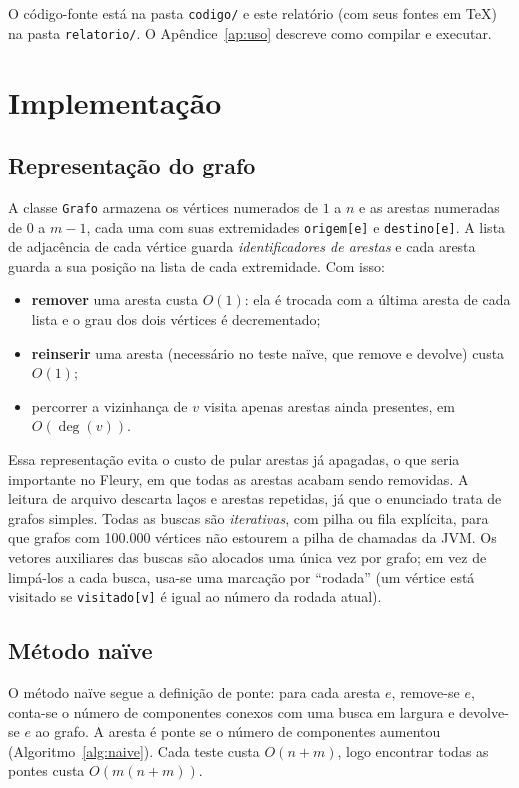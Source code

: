 \documentclass[a4paper,11pt]{article}
\begin{document}
O código-fonte está na pasta \texttt{codigo/} e este relatório (com seus fontes em \TeX) na pasta
\texttt{relatorio/}. O Apêndice~\ref{ap:uso} descreve como compilar e executar.

\section{Implementação}

\subsection{Representação do grafo}

A classe \texttt{Grafo} armazena os vértices numerados de $1$ a $n$ e as arestas numeradas de $0$
a $m-1$, cada uma com suas extremidades \texttt{origem[e]} e \texttt{destino[e]}. A lista de
adjacência de cada vértice guarda \emph{identificadores de arestas} e cada aresta guarda a sua posição
na lista de cada extremidade. Com isso:

\begin{itemize}
  \item \textbf{remover} uma aresta custa $O(1)$: ela é trocada com a última aresta de cada lista e o
        grau dos dois vértices é decrementado;
  \item \textbf{reinserir} uma aresta (necessário no teste naïve, que remove e devolve) custa $O(1)$;
  \item percorrer a vizinhança de $v$ visita apenas arestas ainda presentes, em $O(\deg(v))$.
\end{itemize}

Essa representação evita o custo de pular arestas já apagadas, o que seria importante no Fleury,
em que todas as arestas acabam sendo removidas. A leitura de arquivo descarta laços e arestas
repetidas, já que o enunciado trata de grafos simples. Todas as buscas são \emph{iterativas}, com pilha
ou fila explícita, para que grafos com 100.000 vértices não estourem a pilha de chamadas da JVM.
Os vetores auxiliares das buscas são alocados uma única vez por grafo; em vez de limpá-los a cada
busca, usa-se uma marcação por ``rodada'' (um vértice está visitado se \texttt{visitado[v]} é igual ao
número da rodada atual).

\subsection{Método naïve}

O método naïve segue a definição de ponte: para cada aresta $e$, remove-se $e$, conta-se o número de
componentes conexos com uma busca em largura e devolve-se $e$ ao grafo. A aresta é ponte se o número de
componentes aumentou (Algoritmo~\ref{alg:naive}). Cada teste custa $O(n+m)$, logo encontrar todas as
pontes custa $O(m(n+m))$.
\end{document}
